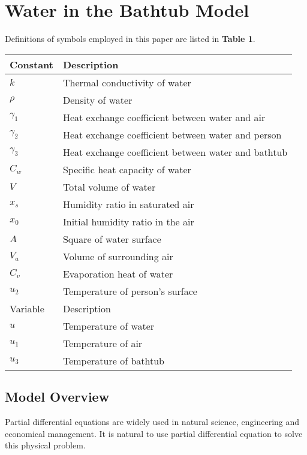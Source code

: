 \documentclass[12pt,a4paper,titlepage]{article}
\begin{document}
\section{Water in the Bathtub Model}
\label{sec:human-capital-model}
Definitions of symbols employed in this paper are listed in
\textbf{Table 1}.
\begin{table}
\begin{tabular}{l|l}
  Constant & Description \\
  \hline
  $k$            &Thermal conductivity of water \\
  $\rho$         &Density of water \\
  ${\gamma}_1$   &Heat exchange coefficient between water and air \\
  ${\gamma}_2$   &Heat exchange coefficient between water and person \\
  ${\gamma}_3$   &Heat exchange coefficient between water and bathtub \\
  $C_w$          &Specific heat capacity of water \\
  $V$            &Total volume of water \\
  $x_s$          &Humidity ratio in saturated air \\
  $x_0$          &Initial humidity ratio in the air \\
  $A$            &Square of water surface \\
  $V_a$          &Volume of surrounding air \\
  $C_v$          &Evaporation heat of water \\
  $u_2$          &Temperature of person's surface \\

  Variable & Description \\
  \hline
  $u$            &Temperature of water \\
  $u_1$          &Temperature of air \\
  $u_3$          &Temperature of bathtub \\
\end{tabular}
\end{table}

\subsection{Model Overview}
\label{sec:model-overview}

Partial differential equations are widely used in natural science, engineering and economical management.
It is natural to use partial differential equation to solve this physical problem.
\end{document}
